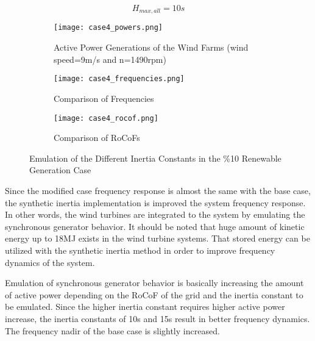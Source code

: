 \begin{equation}
\label{hmax22}
H_{max,all}=10s
\end{equation}
\begin{figure}[h!]
	\centering
\begin{subfigure}{0.9\textwidth}
	\centering	
	\texttt{[image: case4\_powers.png]}
	\caption{Active Power Generations of the Wind Farms (wind speed=9m/s and n=1490rpm)}
	\label{Case4_power}	
\end{subfigure}
	
\vspace{0.1em} %
\begin{subfigure}{0.9\textwidth} %
	\centering	\texttt{[image: case4\_frequencies.png]}
	\caption{Comparison of Frequencies}		
	\label{Case4_freq}
\end{subfigure}
	\vspace{0.1em} %
	\begin{subfigure}{0.9\textwidth}
		\centering	\texttt{[image: case4\_rocof.png]}
		\caption{Comparison of RoCoFs}
		\label{Case4_rocof}	
	\end{subfigure}
	\caption{Emulation of the Different Inertia Constants in the \%10 Renewable Generation Case}
\end{figure}
Since the modified case frequency response is almost the same with the base case, the synthetic inertia implementation is improved the system frequency response. In other words, the wind turbines are integrated to the system by emulating the synchronous generator behavior. It should be noted that huge amount of kinetic energy up to 18MJ exists in the wind turbine systems. That stored energy can be utilized with the synthetic inertia method in order to improve frequency dynamics of the system. \par
Emulation of synchronous generator behavior is basically increasing the amount of active power depending on the RoCoF of the grid and the inertia constant to be emulated. Since the higher inertia constant requires higher active power increase, the inertia constants of 10s and 15s result in better frequency dynamics. The frequency nadir of the base case is slightly increased. \par
